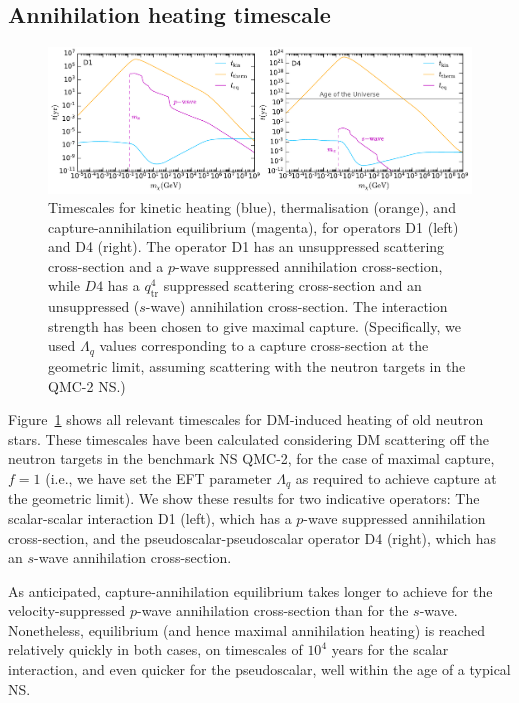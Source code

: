 \subsection{Annihilation heating timescale}
\label{ch6:subsec:AnnHeatTimes}



\begin{figure}[t!bp]
\centering    
\includegraphics[width=\textwidth]{timescales_maxcap_n.pdf}
    \caption{Timescales for kinetic heating (blue), thermalisation (orange), and capture-annihilation equilibrium (magenta), for operators D1 (left) and D4 (right). The operator D1 has an unsuppressed scattering cross-section and a $p$-wave suppressed annihilation cross-section, while $D4$ has a $q_\text{tr}^4$ suppressed scattering cross-section and an unsuppressed ($s$-wave) annihilation cross-section.
    The interaction strength has been chosen to give maximal capture. (Specifically, we used $\Lambda_q$ values corresponding to a capture cross-section at the geometric limit, assuming scattering with the neutron targets in the QMC-2 NS.)   
    }
    \label{ch6:fig:timescales}
\end{figure}



Figure~\ref{ch6:fig:timescales} shows all relevant timescales for DM-induced heating of old neutron stars. These timescales have been calculated considering DM scattering off the neutron targets in the benchmark NS QMC-2, for the case of maximal capture, $f = 1$ (i.e., we have set the EFT parameter $\Lambda_q$ as required to achieve capture at the geometric limit).
We show these results for two indicative operators: The scalar-scalar interaction D1 (left), which has a $p$-wave suppressed annihilation cross-section, and the pseudoscalar-pseudoscalar operator D4 (right), which has an $s$-wave annihilation cross-section. 

As anticipated, capture-annihilation equilibrium takes longer to achieve for the velocity-suppressed $p$-wave annihilation cross-section than for the $s$-wave.  Nonetheless,  
equilibrium (and hence maximal annihilation heating) is reached relatively quickly in both cases, on timescales of $10^4$ years for the scalar interaction, and even quicker for the pseudoscalar, well within the age of a typical NS. 


